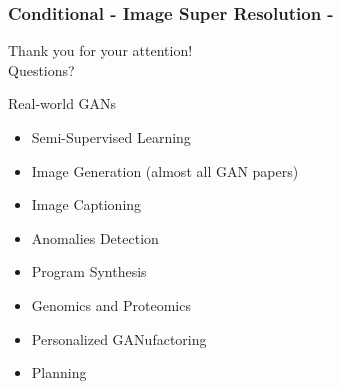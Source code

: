 \documentclass{beamer}
\begin{document}
{
	\begin{frame}
		\frametitle{Conditional - Image Super Resolution - \cite{ledigPhotoRealisticSingleImage2016}}
	\end{frame}
}


\begin{frame}[standout]
	\begin{center}
	\Large	Thank you for your attention! \hfill \\
	\Large	Questions?
	\end{center}
\end{frame}

\appendix

\begin{frame}{Real-world GANs }
	\begin{itemize}
		\item Semi-Supervised Learning \citep{salimansImprovedTechniquesTraining2016a}
		\item Image Generation (almost all GAN papers)
		\item Image Captioning
		\item Anomalies Detection \citep{zenatiEfficientGANBasedAnomaly2018a}
		\item Program Synthesis \citep{ganinSynthesizingProgramsImages2018}
		\item Genomics and Proteomics \citep{killoranGeneratingDesigningDNA2017} \citep{decaoMolGANImplicitGenerative2018}
		\item Personalized GANufactoring \citep{hwangLearningHumanExpertise2018}
		\item Planning
	\end{itemize}
\end{frame}

\begin{frame}[allowframebreaks]
	 
	
\end{frame}
\end{document}
